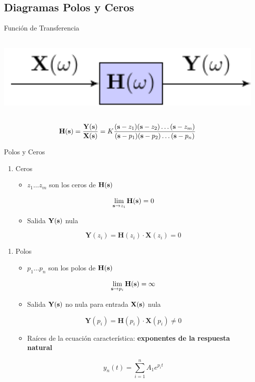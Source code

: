 \subsection{Diagramas Polos y Ceros}
\label{sec:orgcfb6e8d}

{Función de Transferencia}
\begin{center}
\includegraphics[height=4cm]{../figs/TransferFunction.pdf}
\end{center}

\[
  \mathbf{H}(\mathbf{s}) = \frac{\mathbf{Y}(\mathbf{s})}{\mathbf{X}(\mathbf{s})} = K \frac{(\mathbf{s}-z_1) (\mathbf{s} - z_2) \ldots (\mathbf{s} - z_m)}{(\mathbf{s}-p_1) (\mathbf{s} - p_2) \ldots (\mathbf{s} - p_n)}
\]


{Polos y Ceros}
\begin{enumerate}
\item Ceros
\label{sec:orgcadff6f}

\begin{itemize}
\item \(z_1 \ldots z_m\) son los ceros de \(\mathbf{H}(\mathbf{s})\)
\end{itemize}

\[
\lim_{\mathbf{s} \to z_i}\mathbf{H}(\mathbf{s}) = 0
\]

\begin{itemize}
\item Salida \(\mathbf{Y}(\mathbf{s})\) nula
\end{itemize}

\[
\mathbf{Y}(z_i) = \mathbf{H}(z_i) \cdot \mathbf{X}(z_i)  = 0
\]
\end{enumerate}


\begin{enumerate}
\item Polos
\label{sec:org6360bd4}
\begin{itemize}
\item \(p_1 \ldots p_n\) son los polos de \(\mathbf{H}(\mathbf{s})\)
\end{itemize}

\[
\lim_{\mathbf{s} \to p_i}\mathbf{H}(\mathbf{s}) = \infty
\]

\begin{itemize}
\item Salida \(\mathbf{Y}(\mathbf{s})\) no nula para entrada \(\mathbf{X}(\mathbf{s})\) nula
\end{itemize}
\[
\mathbf{Y}(p_i) = \mathbf{H}(p_i) \cdot \mathbf{X}(p_i) \neq 0
\]

\begin{itemize}
\item Raíces de la ecuación característica: \textbf{exponentes de la respuesta natural}
\end{itemize}

\[
  y_n(t) = \sum_{i = 1}^n A_1 e^{p_i t}
\]
\end{enumerate}

